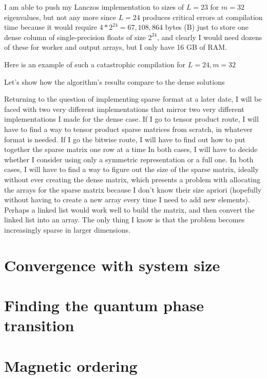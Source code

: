 \documentclass{article}
\begin{document}
I am able to push my Lanczos implementation to sizes of $L = 23$
for $m = 32$ eigenvalues, but not any more since $L = 24$ produces
critical errors at compilation time because it would require
$4 * 2^24 = 67,108,864$ bytes (B) just to store one dense column of 
single-precision floats of size $2^{24}$, and clearly I would need
dozens of these for worker and output arrays, but I only have 16 GB of RAM.

Here is an example of such a catastrophic compilation for $L=24, m=32$


Let's show how the algorithm's results compare to the dense solutions

Returning to the question of implementing sparse format at a later date,
I will be faced with two very different implementations that mirror
two very different implementations I made for the dense case.
If I go to tensor product route, I will have to find a way to tensor
product sparse matrices from scratch, in whatever format is needed.
If I go the bitwise route, I will have to find out how to put together
the sparse matrix one row at a time
In both cases, I will have to decide whether I consider using only a
symmetric representation or a full one.
In both cases, I will have to find a way to figure out the size of the
sparse matrix, ideally without ever creating the dense matrix, which
presents a problem with allocating the arrays for the sparse matrix
because I don't know their size apriori (hopefully without having to create 
a new array every time I need to add new elements).
Perhaps a linked list would work well to build the matrix, and then 
convert the linked list into an array.
The only thing I know is that the problem becomes
increasingly sparse in larger dimensions. 

\newpage

\section{
Convergence with system size
}



\newpage

\section{
Finding the quantum phase transition
}



\newpage

\section{
Magnetic ordering
}
\end{document}
